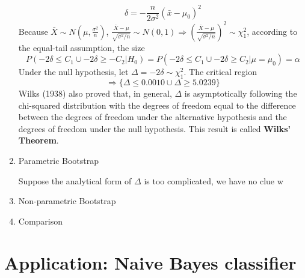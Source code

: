 \begin{enumerate}
\begin{equation*}
			\delta = -\frac{n}{2\sigma^2}(\bar{x} - \mu_0)^2
		\end{equation*}
		Because $\bar{X} \sim N(\mu, \frac{\sigma^2}{n})$, $\frac{\bar{X} - \mu}{\sqrt{\sigma^2/n}} \sim N(0, 1) \Rightarrow (\frac{\bar{X} - \mu}{\sqrt{\sigma^2/n}})^2 \sim \chi^2_1$, according to the equal-tail assumption, the size
		\begin{equation*}
			P( -2\delta \le C_1\cup -2\delta \ge -C_2 | H_0 ) = P(  -2\delta \le C_1 \cup-2\delta \ge C_2 | \mu = \mu_0 ) = \alpha  
		\end{equation*}	
		Under the null hypothesis, let $\Delta = -2\delta \sim \chi^2_1$. The critical region	 
		\begin{equation*}
			\Rightarrow \{   \Delta \le 0.0010\cup \Delta \ge 5.0239\}
		\end{equation*}
		Wilks (1938) \cite{Wilks} also proved that, in general, $\Delta$ is asymptotically following the chi-squared distribution with the degrees of freedom equal to the difference between the degrees of freedom under the alternative hypothesis and the degrees of freedom under the null hypothesis. This result is called \textbf{Wilks' Theorem}.
	\item Parametric Bootstrap
		\par Suppose the analytical form of $\Delta$ is too complicated, we have no clue w
	\item Non-parametric Bootstrap
	\item Comparison
\end{enumerate}

\section{Application: Naive Bayes classifier}